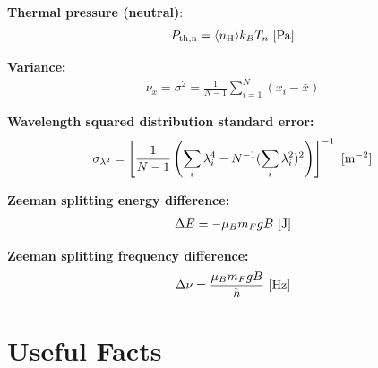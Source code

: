 \documentclass[a4paper,10pt]{article}
\begin{document}
{\noindent}\textbf{Thermal pressure (neutral)}:
\begin{align*}
    P_{\rm th,n} = \langle n_{\rm H}\rangle k_BT_n ~ [{\rm Pa}]
\end{align*}

{\noindent}\textbf{Variance:}
\begin{align*}
    \nu_x = \sigma^2= \frac{1}{N-1} \sum_{i=1}^N (x_i-\bar{x})
\end{align*}

{\noindent}\textbf{Wavelength squared distribution standard error:} 
\begin{align*}
\sigma_{\lambda^2} = \left[ \dfrac{1}{N-1} \left( \sum_i\lambda_i^4 - N^{-1}(\sum_i\lambda_i^2)^2 \right) \right]^{-1} ~ [{\rm m^{-2}}]
\end{align*}

{\noindent}\textbf{Zeeman splitting energy difference:}
\begin{align*}
    \Delta E = -\mu_Bm_FgB ~ [{\rm J}]
\end{align*}

{\noindent}\textbf{Zeeman splitting frequency difference:}
\begin{align*}
    \Delta\nu = \frac{\mu_Bm_FgB}{h} ~ [{\rm Hz}]
\end{align*}
































\newpage
\section{Useful Facts}
\end{document}
